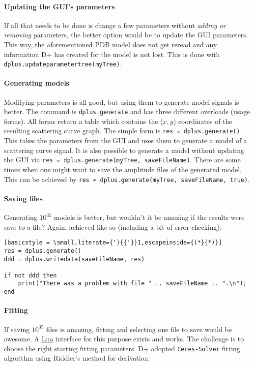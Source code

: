 \documentclass[../D+Manual.tex]{subfiles}
\begin{document}
\paragraph{Updating the GUI's parameters}
If all that needs to be done is change a few parameters without \textit{adding or removing} parameters, the better option would be to update the GUI parameters.
This way, the aforementioned PDB model does not get reread and any information D+ has created for the model is not lost.
This is done with \lstinline{dplus.updateparametertree(myTree)}.

\paragraph{Generating models}
Modifying parameters is all good, but using them to generate model signals is better.
The command is \lstinline{dplus.generate} and has three different overloads (usage forms).
All forms return a table which contains the ($x,y$) coordinates of the resulting scattering curve graph.
The simple form is \lstinline{res = dplus.generate()}.
This takes the parameters from the GUI and uses them to generate a model of a scattering curve signal.
It is also possible to generate a model without updating the GUI via
\lstinline{res = dplus.generate(myTree, saveFileName)}.
There are some times when one might want to save the amplitude files of the generated model.
This can be achieved by \lstinline{res = dplus.generate(myTree, saveFileName, true)}.

\paragraph{Saving files}
Generating $10^{35}$ models is better, but wouldn't it be amazing if the results were save to a file?
Again, achieved like so (including a bit of error checking):
\begin{lstlisting}[basicstyle = \small,literate={'}{{'}}1,escapeinside={(*}{*)}]
res = dplus.generate()
ddd = dplus.writedata(saveFileName, res)

if not ddd then
	print("There was a problem with file " .. saveFileName .. ".\n");
end
\end{lstlisting}

\paragraph{Fitting}

If saving $10^{35}$ files is amazing, fitting and selecting one file to save would be awesome.
A \href{http://www.lua.org/}{Lua} interface for this purpose  exists and works. The challenge is to choose the right starting fitting parameters. D+ adopted \href{http://ceres-solver.org/}{\texttt{Ceres-Solver}} fitting algorithm using Riddler's method for derivation.
\end{document}
